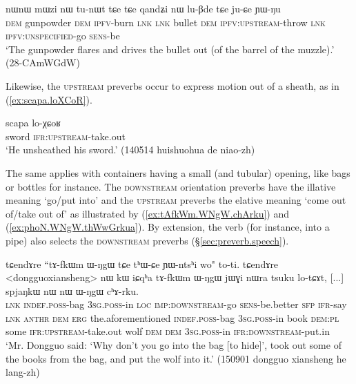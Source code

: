 \begin{exe}
\ex \label{ex:qandZi.luBde}
\gll nɯnɯ mɯzi nɯ tu-nɯt tɕe tɕe qandʑi nɯ lu-βde tɕe ju-ɕe ɲɯ-ŋu \\
\textsc{dem} gunpowder \textsc{dem} \textsc{ipfv}-burn \textsc{lnk} \textsc{lnk} bullet \textsc{dem} \textsc{ipfv}:\textsc{upstream}-throw \textsc{lnk} \textsc{ipfv}:\textsc{unspecified}-go \textsc{sens}-be \\
\glt `The gunpowder flares and drives the bullet out (of the barrel of the muzzle).' (28-CAmWGdW)
\end{exe}

Likewise, the \textsc{upstream} preverbs occur to express motion out of a sheath, as in (\ref{ex:scapa.loXCoR}).

\begin{exe}
\ex \label{ex:scapa.loXCoR}
\gll  scapa lo-χɕoʁ \\
sword \textsc{ifr}:\textsc{upstream}-take.out  \\
\glt `He unsheathed his sword.' (140514 huishuohua de niao-zh) 
\end{exe}

The same applies with containers having a small (and tubular) opening, like bags or bottles for instance. The \textsc{downstream} orientation preverbs have the illative meaning `go/put into' and the \textsc{upstream} preverbs the elative meaning `come out of/take out of' as illustrated by (\ref{ex:tAfkWm.WNgW.chArku}) and  (\ref{ex:phoN.WNgW.thWwGrkua}). By extension, the verb  (for instance, into a pipe) also selects the \textsc{downstream} preverbs (§\ref{sec:preverb.speech}).

\begin{exe}
\ex \label{ex:tAfkWm.WNgW.chArku}
\gll  tɕendɤre ``tɤ-fkɯm ɯ-ŋgɯ tɕe tʰɯ-ɕe ɲɯ-ntsʰi wo" to-ti. tɕendɤre <dongguoxiansheng> nɯ kɯ iɕqʰa tɤ-fkɯm ɯ-ŋgɯ jɯɣi nɯra tsuku lo-tɕɤt, [...] spjaŋkɯ nɯ nɯ ɯ-ŋgɯ cʰɤ-rku. \\
\textsc{lnk}  \textsc{indef}.\textsc{poss}-bag \textsc{3sg}.\textsc{poss}-in \textsc{loc} \textsc{imp}:\textsc{downstream}-go \textsc{sens}-be.better \textsc{sfp} \textsc{ifr}-say \textsc{lnk}  \textsc{anthr} \textsc{dem} \textsc{erg} the.aforementioned  \textsc{indef}.\textsc{poss}-bag \textsc{3sg}.\textsc{poss}-in book \textsc{dem}:\textsc{pl} some \textsc{ifr}:\textsc{upstream}-take.out { } wolf \textsc{dem} \textsc{dem}  \textsc{3sg}.\textsc{poss}-in \textsc{ifr}:\textsc{downstream}-put.in \\
\glt `Mr. Dongguo said: `Why don't you go into the bag [to hide]', took out some of the books from the bag, and put the wolf into it.' (150901 dongguo xiansheng he lang-zh)
\end{exe}

